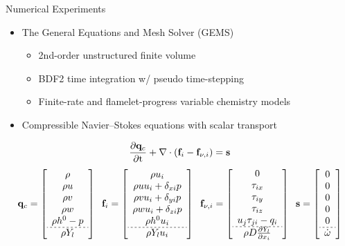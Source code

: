 \documentclass[]{beamer}
\begin{document}
\begin{frame}{Numerical Experiments}
    \begin{itemize}
		\item The General Equations and Mesh Solver (GEMS)
		\begin{itemize}
			\item 2nd-order unstructured finite volume
			\item BDF2 time integration w/ pseudo time-stepping
			\item Finite-rate and flamelet-progress variable chemistry models
		\end{itemize}
		\item Compressible Navier--Stokes equations with scalar transport
	\end{itemize}
	\begin{equation*}
		\frac{\partial \mathbf{q}_c}{\partial \text{t}} + \nabla \cdot (\mathbf{f}_{i} - \mathbf{f}_{\nu,i}) = \mathbf{s}
	\end{equation*}
	\scriptsize
	\def\arraystretch{2}
	\begin{equation*}
		\consVec = \left[
		\begin{array}{c}
		\rho \\ \rho u \\ \rho v \\ \rho w \\ \rho h^0 - p \\ \hdashline[2pt/2pt] \rho Y_{\specIdx} \\
		\end{array}
		\right]  \; \;
		\invFluxDir = \left[
		\begin{array}{c}
		\rho u_i \\  \rho uu_i + \delta_{xi} p \\ \rho vu_i + \delta_{yi} p \\ \rho wu_i + \delta_{zi} p \\ \rho h^0 u_i \\ \hdashline[2pt/2pt] \rho Y_{\specIdx} u_i 
		\end{array}
		\right]  \; \;
		\viscFluxDir = \left[
		\begin{array}{c}
		0 \\ \tau_{ix} \\ \tau_{iy} \\ \tau_{iz} \\ u_j \tau_{ji} - q_i \\ \hdashline[2pt/2pt] \rho D  \pde{Y_{\specIdx}}{x_i}
		\end{array}
		\right]  \; \;
		\mathbf{s} = \left[
		\begin{array}{c}
		0 \\ 0 \\ 0 \\ 0 \\ 0 \\ \hdashline[2pt/2pt] \dot{\omega}
		\end{array} \right]
	\end{equation*}
	\normalsize
\end{frame}
\end{document}
